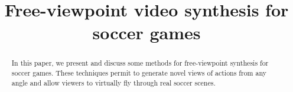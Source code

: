 \documentclass[conference]{IEEEtran}
\begin{document}
\title{Free-viewpoint video synthesis for soccer games\\
}

\author{
}

\maketitle

\begin{abstract}
In this paper, we present and discuss some methods for free-viewpoint synthesis for soccer games.
These techniques permit to generate novel views of actions from any angle and allow viewers to virtually fly through real soccer scenes.

\end{abstract}















\end{document}
